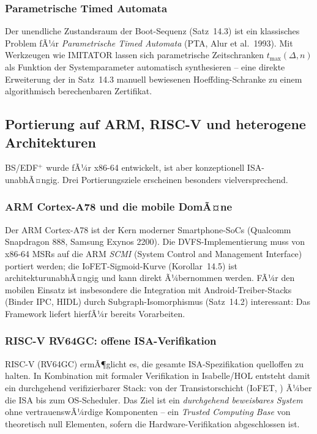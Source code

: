 ﻿\documentclass[a4paper,12pt]{scrreprt}
\theoremstyle{definition}
\begin{document}
	\subsubsection{Parametrische Timed Automata}
	
	Der unendliche Zustandsraum der Boot-Sequenz (Satz~14.3) ist ein klassisches
	Problem fÃ¼r \emph{Parametrische Timed Automata} (PTA, Alur et al.\ 1993).
	Mit Werkzeugen wie IMITATOR lassen sich parametrische Zeitschranken
	$t_{\max}(\Delta, n)$ als Funktion der Systemparameter automatisch synthesieren --
	eine direkte Erweiterung der in Satz~14.3 manuell bewiesenen
	Hoeffding-Schranke zu einem algorithmisch berechenbaren Zertifikat.
	
	\subsection{Portierung auf ARM, RISC-V und heterogene Architekturen}
	
	BS/EDF$^+$ wurde fÃ¼r x86-64 entwickelt, ist aber konzeptionell
	ISA-unabhÃ¤ngig. Drei Portierungsziele erscheinen besonders vielversprechend.
	
	\subsubsection{ARM Cortex-A78 und die mobile DomÃ¤ne}
	
	Der ARM Cortex-A78 ist der Kern moderner Smartphone-SoCs
	(Qualcomm Snapdragon 888, Samsung Exynos 2200). Die DVFS-Implementierung
	muss von x86-64 MSRs auf die ARM \emph{SCMI} (System Control and
	Management Interface) portiert werden; die IoFET-Sigmoid-Kurve (Korollar~14.5)
	ist architekturunabhÃ¤ngig und kann direkt Ã¼bernommen werden.
	FÃ¼r den mobilen Einsatz ist insbesondere die Integration mit
	Android-Treiber-Stacks (Binder IPC, HIDL) durch Subgraph-Isomorphismus
	(Satz~14.2) interessant: Das Framework \cite{Epp2026mobde} liefert
	hierfÃ¼r bereits Vorarbeiten.
	
	\subsubsection{RISC-V RV64GC: offene ISA-Verifikation}
	
	RISC-V (RV64GC) ermÃ¶glicht es, die gesamte ISA-Spezifikation quelloffen
	zu halten. In Kombination mit formaler Verifikation in Isabelle/HOL
	entsteht damit ein durchgehend verifizierbarer Stack: von der
	Transistorschicht (IoFET, \cite{Epp2026iono}) Ã¼ber die ISA bis zum
	OS-Scheduler. Das Ziel ist ein \emph{durchgehend beweisbares System}
	ohne vertrauenswÃ¼rdige Komponenten -- ein \emph{Trusted Computing Base}
	von theoretisch null Elementen, sofern die Hardware-Verifikation
	abgeschlossen ist.
	
\end{document}
